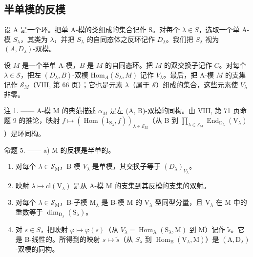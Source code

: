 \subsection{半单模的反模}

设 A 是一个环。把单 A-模的类组成的集合记作 S。对每个 \(\lambda \in S\)，选取一个单 A-模 \(S_{\lambda}\)，其类为 \(\lambda\)，并把 \(S_{\lambda}\) 的自同态体之反环记作 \(D_{\lambda}\)。我们把 \(S_{\lambda}\) 视为 \((A, D_{\lambda})\)-双模。

设 \(M\) 是一个半单 A-模，\(B\) 是 \(M\) 的自同态环。把 \(M\) 的双交换子记作 \(C\)。对每个 \(\lambda \in \mathcal{S}\)，把左 \((D_{\lambda}, B)\)-双模 \(\mathrm{Hom}_A(S_{\lambda}, M)\) 记作 \(V_{\lambda}\)。最后，把 A-模 \(M\) 的支集记作 \(\mathcal{S}_M\)（VIII, 第 66 页）；它也是元素 \(\lambda\)（属于 \(\mathcal{S}\)）组成的集合，这些元素使 \(V_{\lambda}\) 非零。

注 1. —— A-模 M 的典范描述 \(\alpha_{M}\) 是左 (A, B)-双模的同构。由 VIII, 第 71 页命题 9 的推论，映射 \(f \mapsto (\operatorname{Hom}(1_{\mathrm{S}_{\lambda}}, f))_{\lambda \in \mathcal{S}_{\mathrm{M}}}\)（从 B 到 \(\prod_{\lambda \in \mathcal{S}_{\mathrm{M}}} \operatorname{End}_{\mathrm{D}_{\lambda}}(\mathrm{V}_{\lambda})\)）是环同构。

命题 5. —— a) M 的反模是半单的。

\begin{enumerate}
\def\labelenumi{\alph{enumi})}
\setcounter{enumi}{1}
\item
  对每个 \(\lambda \in \mathcal{S}_{\mathrm{M}}\)，B-模 \(V_{\lambda}\) 是单模，其交换子等于 \((D_{\lambda})_{V_{\lambda}}\)。
\item
  映射 \(\lambda \mapsto \mathrm{cl}(\mathrm{V}_{\lambda})\) 是从 A-模 M 的支集到其反模的支集的双射。
\item
  对每个 \(\lambda \in \mathcal{S}_{\mathrm{M}}\)，B-子模 \(\mathrm{M}_{\lambda}\) 是 B-模 M 的 \(\mathrm{V}_{\lambda}\) 型同型分量，且 \(\mathrm{V}_{\lambda}\) 在 M 中的重数等于 \(\dim_{\mathrm{D}_{\lambda}}(\mathrm{S}_{\lambda})\)。
\item
  对 \(s \in S\)，把映射 \(\varphi \mapsto \varphi(s)\)（从 \(V_{\lambda} = \operatorname{Hom}_{\mathrm{A}}(\mathrm{S}_{\lambda}, \mathrm{M})\) 到 M）记作 \(\widetilde{s}\)。它是 B-线性的。所得到的映射 \(s \mapsto \widetilde{s}\)（从 \(S_{\lambda}\) 到 \(\operatorname{Hom}_{\mathrm{B}}(\mathrm{V}_{\lambda}, \mathrm{M})\)）是 \((\mathrm{A}, \mathrm{D}_{\lambda})\)-双模的同构。
\end{enumerate}

